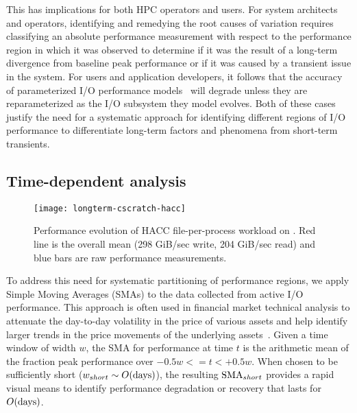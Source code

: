 This has implications for both HPC operators and users.
For system architects and operators, identifying and remedying the root causes of variation requires classifying an absolute performance measurement with respect to the performance region in which it was observed to determine if it was the result of a long-term divergence from baseline peak performance or if it was caused by a transient issue in the system.
For users and application developers, it follows that the accuracy of parameterized I/O performance models~\cite{Xie2012,Madireddy2017} will degrade unless they are reparameterized as the I/O subsystem they model evolves.
Both of these cases justify the need for a systematic approach for identifying different regions of I/O performance to differentiate long-term factors and phenomena from short-term transients.





\subsection{Time-dependent analysis} \label{sec:features/timedependent}

\begin{figure}[t]
    \centering
    \texttt{[image: longterm-cscratch-hacc]}
    \vspace{-.35in}
    \caption{Performance evolution of HACC file-per-process workload on \cori.  Red line is the overall mean (298 GiB/sec write, 204 GiB/sec read) and blue bars are raw performance measurements.}
    \label{fig:timeseries-baseline}
\end{figure}

To address this need for systematic partitioning of performance regions, we apply Simple Moving Averages (SMAs) to the data collected from active I/O performance.
This approach is often used in financial market technical analysis to attenuate the day-to-day volatility in the price of various assets and help identify larger trends in the price movements of the underlying assets~\cite{james1968monthly,gunasekarage2001profitability}.
Given a time window of width $w$, the SMA for performance at time $t$ is the arithmetic mean of the fraction peak performance over ${-0.5w <= t < +0.5w}$.
When chosen to be sufficiently short (${w_{short} \sim O(\textup{days})}$), the resulting $\textup{SMA}_{short}$ provides a rapid visual means to identify performance degradation or recovery that lasts for $O(\textup{days})$.

